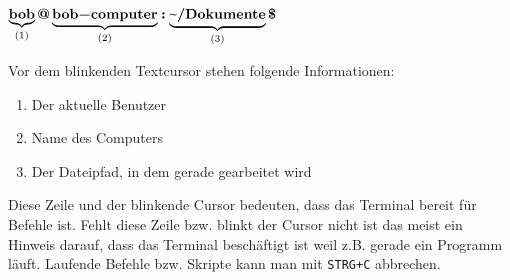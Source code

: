 \( \underbrace{\textbf{\lstinline|bob|}}_{(1)} \textbf{\lstinline|@|} \underbrace{\textbf{\lstinline|bob-computer|}}_{(2)} \textbf{\lstinline|:|} \underbrace{\textbf{\textapprox\lstinline|/Dokumente|}}_{(3)} \textbf{\lstinline|$|} \)

Vor dem blinkenden Textcursor stehen folgende Informationen:
\begin{enumerate}
\item Der aktuelle Benutzer
\item Name des Computers
\item Der Dateipfad, in dem gerade gearbeitet wird
\end{enumerate}

Diese Zeile und der blinkende Cursor bedeuten, dass das Terminal bereit für Befehle ist. Fehlt diese Zeile bzw. blinkt der Cursor nicht ist das meist ein Hinweis darauf, dass das Terminal beschäftigt ist weil z.B. gerade ein Programm läuft. Laufende Befehle bzw. Skripte kann man mit \lstinline|STRG+C| abbrechen.

